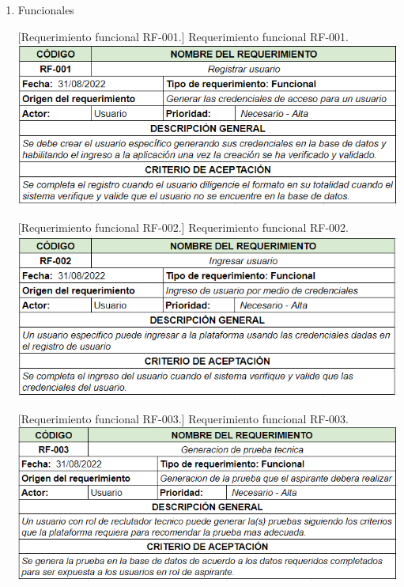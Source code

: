 \begin{enumerate}
    \item Funcionales
        
        
        
        \vspace{2mm}
        \begin{minipage}{0.8\textwidth}
        \centering
        [{Requerimiento funcional RF-001.}]{ Requerimiento funcional RF-001. }
        \label{req1}
         \includegraphics[width=1\textwidth]{Images/1.png}
        \end{minipage}
        
        \vspace{2mm}
        \begin{minipage}{0.9\textwidth}
        \centering
        [{Requerimiento funcional RF-002.}]{ Requerimiento funcional RF-002. }
        \label{req2}
         \includegraphics[width=1\textwidth]{Images/2.png}
        \end{minipage}
        
        \vspace{2mm}
        \begin{minipage}{0.9\textwidth}
        \centering
        [{Requerimiento funcional RF-003.}]{ Requerimiento funcional RF-003. }
        \label{req3}
         \includegraphics[width=1\textwidth]{Images/3.png}
        \end{minipage}
        

\end{enumerate}

